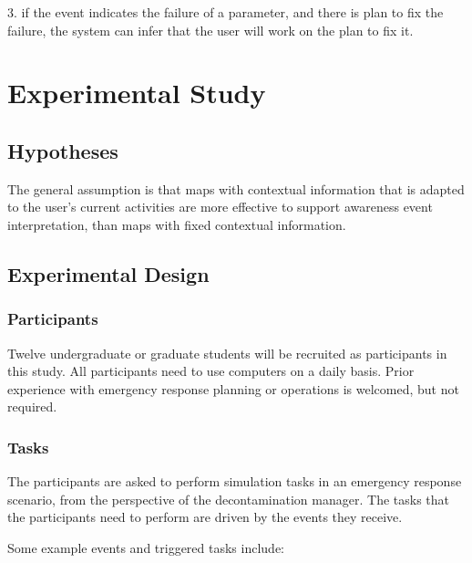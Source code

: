 3. if the event indicates the failure of a parameter, and there is plan to fix the failure, the system can infer that the user will work on the plan to fix it.


\section{Experimental Study}
\subsection{Hypotheses} %
\label{sec:hypotheses}
The general assumption is that maps with contextual information that is adapted to the user's current activities are more effective to support awareness event interpretation, than maps with fixed contextual information.

\subsection{Experimental Design} %
\label{sec:experimental_design}
\subsubsection{Participants} %
\label{sub:participants}
Twelve undergraduate or graduate students will be recruited as participants in this study. All participants need to use computers on a daily basis. Prior experience with emergency response planning or operations is welcomed, but not required.

\subsubsection{Tasks} %
\label{sub:tasks}
The participants are asked to perform simulation tasks in an emergency response scenario, from the perspective of the decontamination manager. The tasks that the participants need to perform are driven by the events they receive.

Some example events and triggered tasks include:

